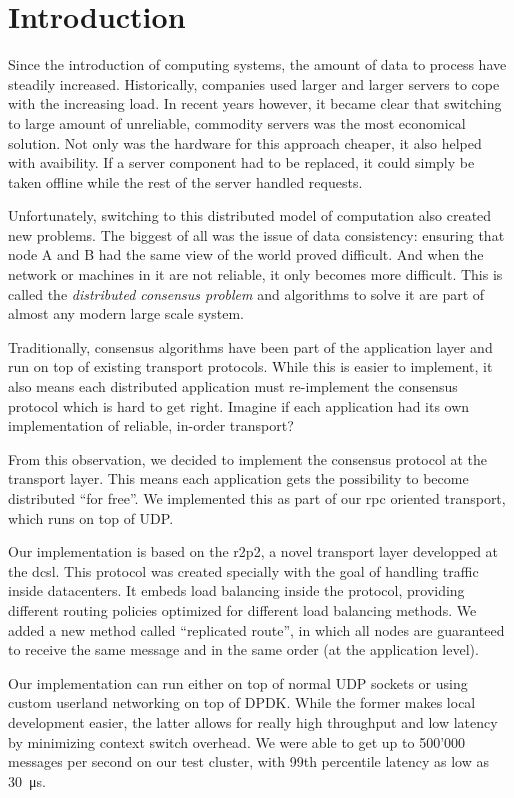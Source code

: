 \chapter{Introduction}

Since the introduction of computing systems, the amount of data to process have steadily increased.
Historically, companies used larger and larger servers to cope with the increasing load.
In recent years however, it became clear that switching to large amount of unreliable, commodity servers was the most economical solution.
Not only was the hardware for this approach cheaper, it also helped with avaibility.
If a server component had to be replaced, it could simply be taken offline while the rest of the server handled requests.

Unfortunately, switching to this distributed model of computation also created new problems.
The biggest of all was the issue of data consistency: ensuring that node A and B had the same view of the world proved difficult.
And when the network or machines in it are not reliable, it only becomes more difficult.
This is called the \emph{distributed consensus problem} and algorithms to solve it are part of almost any modern large scale system.

Traditionally, consensus algorithms have been part of the application layer and run on top of existing transport protocols.
While this is easier to implement, it also means each distributed application must re-implement the consensus protocol which is hard to get right.
Imagine if each application had its own implementation of reliable, in-order transport?

From this observation, we decided to implement the consensus protocol at the transport layer.
This means each application gets the possibility to become distributed ``for free''.
We implemented this as part of our \gls{rpc} oriented transport, which runs on top of UDP.

Our implementation is based on the \gls{r2p2}, a novel transport layer developped at the \gls{dcsl}.
This protocol was created specially with the goal of handling traffic inside datacenters.
It embeds load balancing inside the protocol, providing different routing policies optimized for different load balancing methods.
We added a new method called ``replicated route'', in which all nodes are guaranteed to receive the same message and in the same order (at the application level).

Our implementation can run either on top of normal UDP sockets or using custom userland networking on top of DPDK.
While the former makes local development easier, the latter allows for really high throughput and low latency by minimizing context switch overhead.
We were able to get up to 500'000 messages per second on our test cluster, with 99th percentile latency as low as \SI{30}{\micro\second}.


